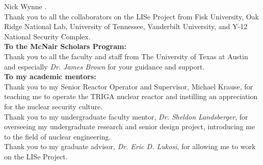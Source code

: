 \documentclass[../main.tex]{subfiles}
\begin{document}
\begin{flushleft}
{            Nick Wynne
        }.\\%
        Thank you to all the collaborators on the LISe Project from Fisk University, Oak Ridge National Lab, University of Tennessee, Vanderbilt University, and Y-12 National Security Complex.\\%
        \vspace{\tmp}%
        \textbf{To the McNair Scholars Program:}\\%
        Thank you to all the faculty and staff from The University of Texas at Austin and especially \emph{Dr. James Brown} for your guidance and support.\\%
        \vspace{\tmp}%
        \vspace{\tmp}%
        \textbf{To my academic mentors:}\\%
        Thank you to my Senior Reactor Operator and Supervisor, Michael Krause, for teaching me to operate the TRIGA nuclear reactor and instilling an appreciation for the nuclear security culture.\\%
        Thank you to my undergraduate faculty mentor, \emph{Dr. Sheldon Landsberger}, for overseeing my undergraduate research and senior design project, introducing me to the field of nuclear engineering.\\%
        Thank you to my graduate advisor, \emph{Dr. Eric D. Lukosi}, for allowing me to work on the LISe Project.\\%
        \vspace{\fill}%
    \end{flushleft}%
\end{document}
